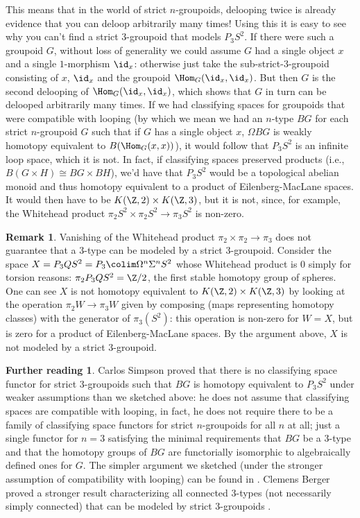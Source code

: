 \documentclass[12pt]{amsart}
\theoremstyle{definition} \newtheorem{definition}[theorem]{Definition}
\newtheorem{remark}[theorem]{Remark}
\newtheorem*{further}{Further reading}
\numberwithin{equation}{section}
\begin{document}
This means that in the world of strict $n$-groupoids, delooping twice
is already evidence that you can deloop arbitrarily many times! Using
this it is easy to see why you can't find a strict $3$-groupoid that
models $P_3 S^2$. If there were such a groupoid $G$, without loss of
generality we could assume $G$ had a single object $x$ and a single
$1$-morphism $\id_x$: otherwise just take the sub-strict-$3$-groupoid
consisting of $x$, $\id_x$ and the groupoid $\Hom_G(\id_x, \id_x)$.
But then $G$ is the second delooping of $\Hom_G(\id_x, \id_x)$, which
shows that $G$ in turn can be delooped arbitrarily many times. If we
had classifying spaces for groupoids that were compatible with looping
(by which we mean we had an $n$-type $BG$ for each strict $n$-groupoid
$G$ such that if $G$ has a single object $x$, $\Omega BG$ is weakly
homotopy equivalent to $B(\Hom_G(x,x))$), it would follow that $P_3
S^2$ is an infinite loop space, which it is not. In fact, if
classifying spaces preserved products (i.e., $B(G \times H) \cong BG
\times BH$), we'd have that $P_3 S^2$ would be a topological abelian
monoid and thus homotopy equivalent to a product of Eilenberg-MacLane
spaces. It would then have to be $K(\Z,2) \times K(\Z,3)$, but it is
not, since, for example, the Whitehead product $\pi_2 S^2 \times \pi_2
S^2 \to \pi_3 S^2$ is non-zero.

\begin{remark} Vanishing of the Whitehead product $\pi_2 \times \pi_2
\to \pi_3$ does not guarantee that a $3$-type can be modeled by a
strict $3$-groupoid. Consider the space $X = P_3 Q S^2 = P_3 \colim
\Omega^n \Sigma^n S^2$ whose Whitehead product is $0$ simply for
torsion reasons: $\pi_2 P_3QS^2 = \Z/2$, the first stable homotopy
group of spheres. One can see $X$ is not homotopy equivalent to
$K(\Z,2) \times K(\Z,3)$ by looking at the operation $\pi_2 W \to
\pi_3 W$ given by composing (maps representing homotopy classes) with
the generator of $\pi_3(S^2)$: this operation is non-zero for $W=X$,
but is zero for a product of Eilenberg-MacLane spaces. By the argument
above, $X$ is not modeled by a strict $3$-groupoid. \end{remark}

\begin{further} Carlos Simpson \cite[Section 2.7]{Simpson} proved that
there is no classifying space functor for strict $3$-groupoids such
that $BG$ is homotopy equivalent to $P_3S^2$ under weaker assumptions
than we sketched above: he does not assume that classifying spaces are
compatible with looping, in fact, he does not require there to be a
family of classifying space functors for strict $n$-groupoids for all
$n$ at all; just a single functor for $n=3$ satisfying the minimal
requirements that $BG$ be a $3$-type and that the homotopy groups of
$BG$ are functorially isomorphic to algebraically defined ones for
$G$. The simpler argument we sketched (under the stronger assumption
of compatibility with looping) can be found in \cite[Section
2.6]{Simpson}. Clemens Berger proved a stronger result characterizing
all connected $3$-types (not necessarily simply connected) that can be
modeled by strict $3$-groupoids \cite[Corollary 3.4]{Berger}.
\end{further}
\end{document}

